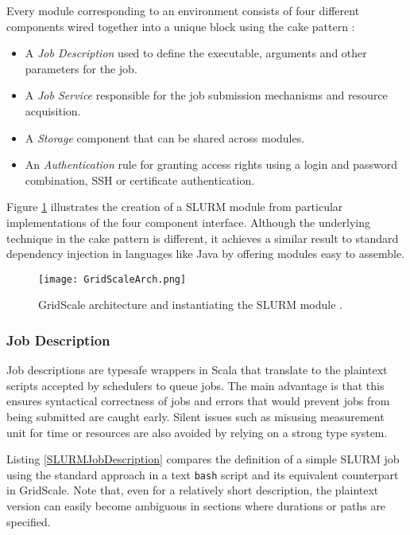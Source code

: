 Every module corresponding to an environment consists of four different components wired together into a unique block using the cake pattern \cite{Cake}:

\begin{itemize}
	\item A \textit{Job Description} used to define the executable, arguments and other parameters for the job.
	\item A \textit{Job Service} responsible for the job submission mechanisms and resource acquisition.
	\item A \textit{Storage} component that can be shared across modules.
	\item An \textit{Authentication} rule for granting access rights using a login and password combination, SSH or certificate authentication.
\end{itemize}

Figure \ref{GridScaleArch} illustrates the creation of a SLURM module from particular implementations of the four component interface. Although the underlying technique in the cake pattern is different, it achieves a similar result to standard dependency injection in languages like Java by offering modules easy to assemble.

\begin{figure}[h]
	\centering
		\texttt{[image: GridScaleArch.png]}
	\caption{GridScale architecture and instantiating the SLURM module \cite{Reuillon2016}.}
	\label{GridScaleArch}
\end{figure}

\subsubsection{Job Description}

Job descriptions are typesafe wrappers in Scala that translate to the plaintext scripts accepted by schedulers to queue jobs. The main advantage is that this ensures syntactical correctness of jobs and errors that would prevent jobs from being submitted are caught early. Silent issues such as misusing measurement unit for time or resources are also avoided by relying on a strong type system. 

Listing \ref{SLURMJobDescription} compares the definition of a simple SLURM job using the standard approach in a text \verb|bash| script and its equivalent counterpart in GridScale. Note that, even for a relatively short description, the plaintext version can easily become ambiguous in sections where durations or paths are specified.

